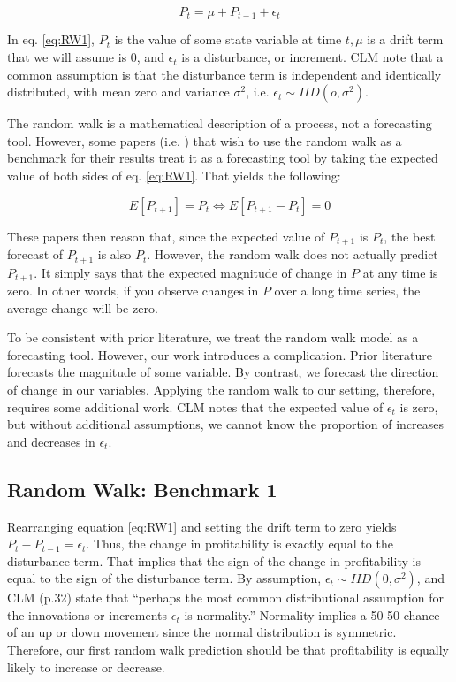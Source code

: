 \begin{equation}
\label{eq:RW1}
P_t = \mu + P_{t-1} + \epsilon_t 
\end{equation}

\noindent In eq. \ref{eq:RW1}, \(P_t\) is the value of some state variable at time \(t, \mu\) is a drift term that we will assume is 0, and \(\epsilon_t\) is a disturbance, or increment.  CLM note that a common assumption is that the disturbance term is independent and identically distributed, with mean zero and variance \(\sigma^2\),  i.e.  \( \epsilon_t \sim IID(o,\sigma^2)\). 

The random walk is a mathematical description of a process, not a forecasting tool. However, some papers (i.e.  \cite{Bradshaw}) that wish to use the random walk as a benchmark for their results treat it as a forecasting tool by taking the expected value of both sides of eq.  \ref{eq:RW1}. That yields the following:

\begin{equation}
\label{eq:RW2}
E[P_{t+1}] = P_t \Leftrightarrow E[P_{t+1} - P_t] = 0
\end{equation}

\noindent These papers then reason that, since the expected value of \(P_{t+1}\) is \(P_t\), the best forecast of \(P_{t+1}\) is also \(P_t\). However, the random walk does not actually predict \(P_{t+1}\). It simply says that the expected magnitude of change in \(P\) at any time is zero. In other words, if you observe changes in \(P\) over a long time series, the average change will be zero.

To be consistent with prior literature, we treat the random walk model as a forecasting tool. However, our work introduces a complication. Prior literature forecasts the magnitude of some variable. By contrast, we forecast the direction of change in our variables. Applying the random walk to our setting, therefore, requires some additional work. CLM notes that the expected value of \(\epsilon_t\) is zero, but without additional assumptions, we cannot know the proportion of increases and decreases in \(\epsilon_t\).

\subsection{Random Walk: Benchmark 1}

Rearranging equation \ref{eq:RW1} and setting the drift term to zero yields \(P_t - P_{t-1} = \epsilon_t\). Thus, the change in profitability is exactly equal to the disturbance term. That implies that the sign of the change in profitability is equal to the sign of the disturbance term. By assumption,  \(\epsilon_t \sim IID(0,\sigma^2)\), and CLM (p.32) state that “perhaps the most common distributional assumption for the innovations or increments \(\epsilon_t\) is normality.” Normality implies a 50-50 chance of an up or down movement since the normal distribution is symmetric. Therefore, our first random walk prediction should be that profitability is equally likely to increase or decrease.


